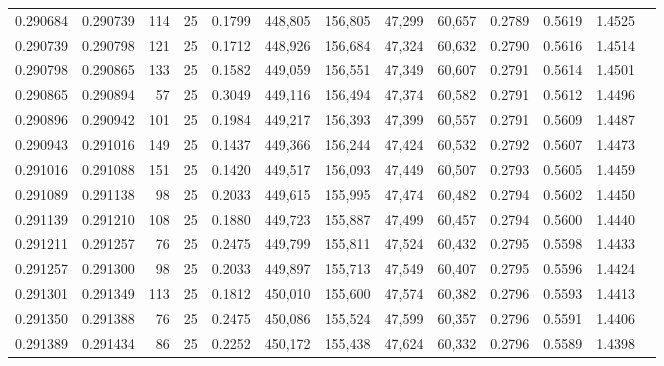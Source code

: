 \begin{tabular}{rrrrrrrrrrrrr}
0.290684 & 0.290739 &   114 &  25 &                                     0.1799 & 448,805 & 156,805 &  47,299 &  60,657 & 0.2789 & 0.5619 & 1.4525 \\
0.290739 & 0.290798 &   121 &  25 &                                     0.1712 & 448,926 & 156,684 &  47,324 &  60,632 & 0.2790 & 0.5616 & 1.4514 \\
0.290798 & 0.290865 &   133 &  25 &                                     0.1582 & 449,059 & 156,551 &  47,349 &  60,607 & 0.2791 & 0.5614 & 1.4501 \\
0.290865 & 0.290894 &    57 &  25 &                                     0.3049 & 449,116 & 156,494 &  47,374 &  60,582 & 0.2791 & 0.5612 & 1.4496 \\
0.290896 & 0.290942 &   101 &  25 &                                     0.1984 & 449,217 & 156,393 &  47,399 &  60,557 & 0.2791 & 0.5609 & 1.4487 \\
0.290943 & 0.291016 &   149 &  25 &                                     0.1437 & 449,366 & 156,244 &  47,424 &  60,532 & 0.2792 & 0.5607 & 1.4473 \\
0.291016 & 0.291088 &   151 &  25 &                                     0.1420 & 449,517 & 156,093 &  47,449 &  60,507 & 0.2793 & 0.5605 & 1.4459 \\
0.291089 & 0.291138 &    98 &  25 &                                     0.2033 & 449,615 & 155,995 &  47,474 &  60,482 & 0.2794 & 0.5602 & 1.4450 \\
0.291139 & 0.291210 &   108 &  25 &                                     0.1880 & 449,723 & 155,887 &  47,499 &  60,457 & 0.2794 & 0.5600 & 1.4440 \\
0.291211 & 0.291257 &    76 &  25 &                                     0.2475 & 449,799 & 155,811 &  47,524 &  60,432 & 0.2795 & 0.5598 & 1.4433 \\
0.291257 & 0.291300 &    98 &  25 &                                     0.2033 & 449,897 & 155,713 &  47,549 &  60,407 & 0.2795 & 0.5596 & 1.4424 \\
0.291301 & 0.291349 &   113 &  25 &                                     0.1812 & 450,010 & 155,600 &  47,574 &  60,382 & 0.2796 & 0.5593 & 1.4413 \\
0.291350 & 0.291388 &    76 &  25 &                                     0.2475 & 450,086 & 155,524 &  47,599 &  60,357 & 0.2796 & 0.5591 & 1.4406 \\
0.291389 & 0.291434 &    86 &  25 &                                     0.2252 & 450,172 & 155,438 &  47,624 &  60,332 & 0.2796 & 0.5589 & 1.4398 \\

\end{tabular}
